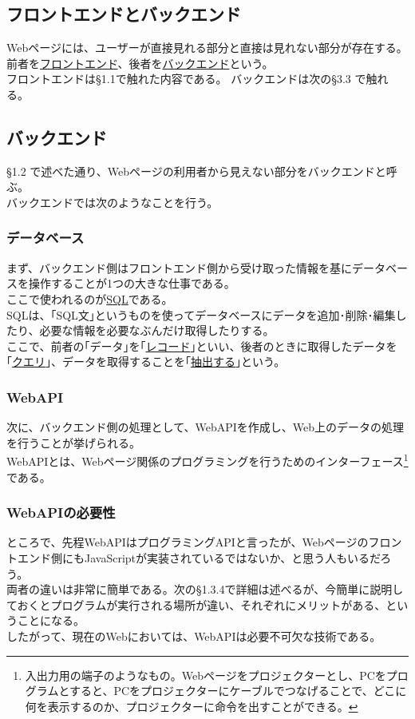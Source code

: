 \documentclass{ltjsarticle}
\begin{document}
\subsection{フロントエンドとバックエンド}
Webページには、ユーザーが直接見れる部分と直接は見れない部分が存在する。\\
前者を\underline{フロントエンド}、後者を\underline{バックエンド}という。\\
フロントエンドは\S 1.1で触れた内容である。
バックエンドは次の\S 3.3 で触れる。

\subsection{バックエンド}
\S 1.2 で述べた通り、Webページの利用者から見えない部分をバックエンドと呼ぶ。\\
バックエンドでは次のようなことを行う。

\subsubsection{データベース}
まず、バックエンド側はフロントエンド側から受け取った情報を基にデータベースを操作することが1つの大きな仕事である。\\
ここで使われるのが\underline{SQL}である。\\
SQLは、｢SQL文｣というものを使ってデータベースにデータを追加･削除･編集したり、必要な情報を必要なぶんだけ取得したりする。\\
ここで、前者の｢データ｣を｢\underline{レコード}｣といい、後者のときに取得したデータを｢\underline{クエリ}｣、データを取得することを｢\underline{抽出する}｣という。

\subsubsection{WebAPI}
次に、バックエンド側の処理として、WebAPIを作成し、Web上のデータの処理を行うことが挙げられる。\\
WebAPIとは、Webページ関係のプログラミングを行うためのインターフェース\footnote[7]{入出力用の端子のようなもの。Webページをプロジェクターとし、PCをプログラムとすると、PCをプロジェクターにケーブルでつなげることで、どこに何を表示するのか、プロジェクターに命令を出すことができる。}である。\

\subsubsection{WebAPIの必要性}
ところで、先程WebAPIはプログラミングAPIと言ったが、Webページのフロントエンド側にもJavaScriptが実装されているではないか、と思う人もいるだろう。\\
両者の違いは非常に簡単である。次の\S 1.3.4で詳細は述べるが、今簡単に説明しておくとプログラムが実行される場所が違い、それぞれにメリットがある、ということになる。\\
したがって、現在のWebにおいては、WebAPIは必要不可欠な技術である。
\end{document}
